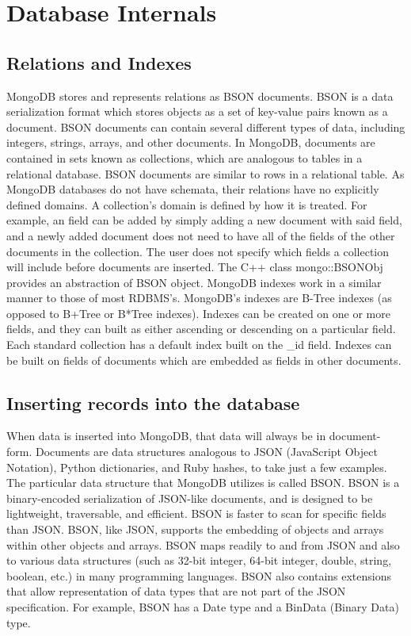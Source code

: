 \documentclass{dependencies/acm_proc_article-sp}
\begin{document}
\section{Database Internals}
\subsection{Relations and Indexes}
MongoDB stores and represents relations as BSON documents\cite{1}.
BSON is a data serialization format which stores objects as a set of key-value pairs known as a document.
BSON documents can contain several different types of data, including integers, strings, arrays, and other documents\cite{2}.
In MongoDB, documents are contained in sets known as collections, which are analogous to tables in a relational database\cite{3}.
BSON documents are similar to rows in a relational table.
As MongoDB databases do not have schemata, their relations have no explicitly defined domains.
A collection's domain is defined by how it is treated.
For example, an field can be added by simply adding a new document with said field, and a newly added document does not need to have all of the fields of the other documents in the collection.
The user does not specify which fields a collection will include before documents are inserted\cite{4}.
The C++ class mongo::BSONObj provides an abstraction of BSON object\cite{5}.
MongoDB indexes work in a similar manner to those of most RDBMS's.
MongoDB's indexes are B-Tree indexes (as opposed to B+Tree or B*Tree indexes).
Indexes can be created on one or more fields, and they can built as either ascending or descending on a particular field.
Each standard collection has a default index built on the \_id field.  Indexes can be built on fields of documents which are embedded as fields in other documents\cite{6}.
\subsection{Inserting records into the database}
When data is inserted into MongoDB, that data will always be in document-form.
Documents are data structures analogous to JSON (JavaScript Object Notation), Python dictionaries, and Ruby hashes, to take just a few examples.
The particular data structure that MongoDB utilizes is called BSON.
BSON is a binary-encoded serialization of JSON-like documents, and is designed to be lightweight, traversable, and efficient.
BSON is faster to scan for specific fields than JSON.
BSON, like JSON, supports the embedding of objects and arrays within other objects and arrays.
BSON maps readily to and from JSON and also to various data structures (such as 32-bit integer, 64-bit integer, double, string, boolean, etc.) in many programming languages.
BSON also contains extensions that allow representation of data types that are not part of the JSON specification.
For example, BSON has a Date type and a BinData (Binary Data) type.
\end{document}
